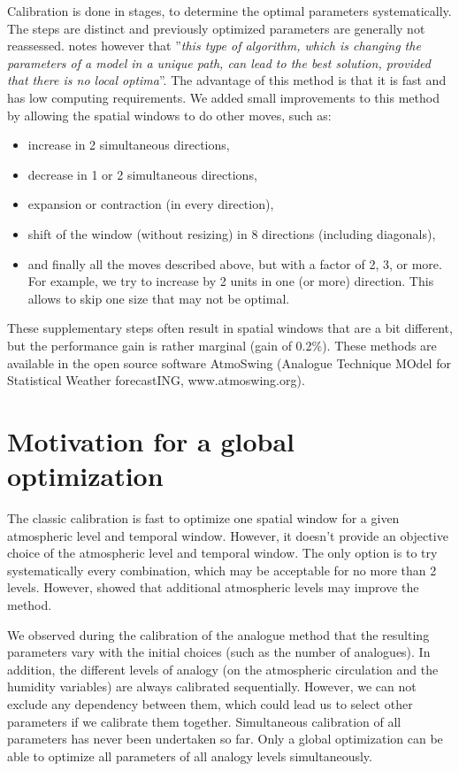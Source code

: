 \documentclass[twocol]{ametsoc}
\begin{document}
Calibration is done in stages, to determine the optimal parameters systematically. The steps are distinct and previously optimized parameters are generally not reassessed. \citet{Bontron2004} notes however that ''\textit{this type of algorithm, which is changing the parameters of a model in a unique path, can lead to the best solution, provided that there is no local optima}''. The advantage of this method is that it is fast and has low computing requirements. We added small improvements to this method by allowing the spatial windows to do other moves, such as:

\begin{itemize}
	\item increase in 2 simultaneous directions,
	\item decrease in 1 or 2 simultaneous directions,
	\item expansion or contraction (in every direction),
	\item shift of the window (without resizing) in 8 directions (including diagonals),
	\item and finally all the moves described above, but with a factor of 2, 3, or more. For example, we try to increase by 2 units in one (or more) direction. This allows to skip one size that may not be optimal.
\end{itemize}

These supplementary steps often result in spatial windows that are a bit different, but the performance gain is rather marginal (gain of 0.2\%). These methods are available in the open source software AtmoSwing (Analogue Technique MOdel for Statistical Weather forecastING, www.atmoswing.org).


\section{Motivation for a global optimization}

The classic calibration is fast to optimize one spatial window for a given atmospheric level and temporal window. However, it doesn't provide an objective choice of the atmospheric level and temporal window. The only option is to try systematically every combination, which may be acceptable for no more than 2 levels. However, \citet{Horton2012a} showed that additional atmospheric levels may improve the method.

We observed during the calibration of the analogue method that the resulting parameters vary with the initial choices (such as the number of analogues). In addition, the different levels of analogy (on the atmospheric circulation and the humidity variables) are always calibrated sequentially. However, we can not exclude any dependency between them, which could lead us to select other parameters if we calibrate them together. Simultaneous calibration of all parameters has never been undertaken so far. Only a global optimization can be able to optimize all parameters of all analogy levels simultaneously.
\end{document}
